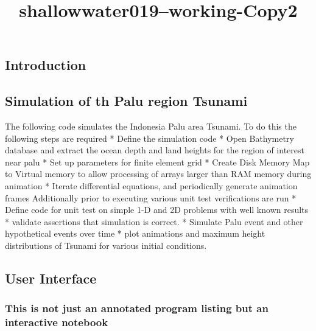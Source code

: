 \documentclass[11pt]{article}
\title{shallowwater019--working-Copy2}
\begin{document}
    
    
    \maketitle
    
    

    
    \hypertarget{introduction}{%
\subsection{Introduction}\label{introduction}}

\hypertarget{simulation-of-th-palu-region-tsunami}{%
\subsection{Simulation of th Palu region
Tsunami}\label{simulation-of-th-palu-region-tsunami}}

The following code simulates the Indonesia Palu area Tsunami. To do this
the following steps are required * Define the simulation code * Open
Bathymetry database and extract the ocean depth and land heights for the
region of interest near palu * Set up parameters for finite element grid
* Create Disk Memory Map to Virtual memory to allow processing of arrays
larger than RAM memory during animation * Iterate differential
equations, and periodically generate animation frames Additionally prior
to executing various unit test verifications are run * Define code for
unit test on simple 1-D and 2D problems with well known results *
validate assertions that simulation is correct. * Simulate Palu event
and other hypothetical events over time * plot animations and maximum
height distributions of Tsunami for various initial conditions.

\hypertarget{user-interface}{%
\subsection{User Interface}\label{user-interface}}

\hypertarget{this-is-not-just-an-annotated-program-listing-but-an-interactive-notebook}{%
\subsubsection{This is not just an annotated program listing but an
interactive
notebook}\label{this-is-not-just-an-annotated-program-listing-but-an-interactive-notebook}}
\end{document}
